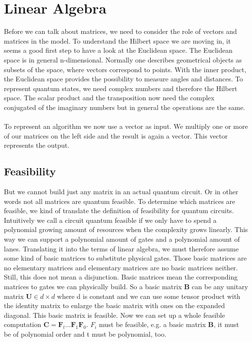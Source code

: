 \documentclass[oneside]{thesisclass}
\begin{document}
\chapter{Linear Algebra}
Before we can talk about matrices, we need to consider the role of vectors and matrices in the model.
To understand the Hilbert space we are moving in, it seems a good first step to have a look at the Euclidean space.
The Euclidean space is in general n-dimensional.
Normally one describes geometrical objects as subsets of the space, where vectors correspond to points.
With the inner product, the Euclidean space provides the possibility to measure angles and distances.
To represent quantum states, we need complex numbers and therefore the Hilbert space.
The scalar product and the transposition now need the complex conjugated of the imaginary numbers but in general the operations are the same.\\
\\To represent an algorithm we now use a vector as input.
We multiply one or more of our matrices on the left side and the result is again a vector.
This vector represents the output.\\

\section{Feasibility}
But we cannot build just any matrix in an actual quantum circuit.
Or in other words not all matrices are quantum feasible.
To determine which matrices are feasible, we kind of translate the definition of feasibility for quantum circuits.
Intuitively we call a circuit quantum feasible if we only have to spend a polynomial growing amount of resources when the complexity grows linearly.
This way we can support a polynomial amount of gates and a polynomial amount of lanes.
Translating it into the terms of linear algebra, we must therefore assume some kind of basic matrices to substitute physical gates.
Those basic matrices are no elementary matrices and elementary matrices are no basic matrices neither.
Still, this does not mean a disjunction.
Basic matrices mean the corresponding matrices to gates we can physically build.
So a basic matrix $\mathbf B$ can be any unitary matrix $\mathbf U \in d \times d$ where d is constant and we can use some tensor product with the identity matrix to enlarge the basic matrix with ones on the expanded diagonal.
This basic matrix is feasible.
Now we can set up a whole feasible computation $\mathbf C = \mathbf F_t...\mathbf F_1\mathbf F_0$.
$F_i$ must be feasible, e.g. a basic matrix $\mathbf B$, it must be of polynomial order and t must be polynomial, too.\\
\end{document}
